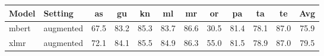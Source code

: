 \begin{tabular}{llcccccccccc}
\toprule
Model & Setting & as & gu & kn & ml & mr & or & pa & ta & te & Avg \\
\midrule
mbert & augmented & 67.5 & 83.2 & 85.3 & 83.7 & 86.6 & 30.5 & 81.4 & 78.1 & 87.0 & 75.9 \\
xlmr & augmented & 72.1 & 84.1 & 85.5 & 84.9 & 86.3 & 55.0 & 81.5 & 78.9 & 87.0 & 79.5 \\
\bottomrule
\end{tabular}
